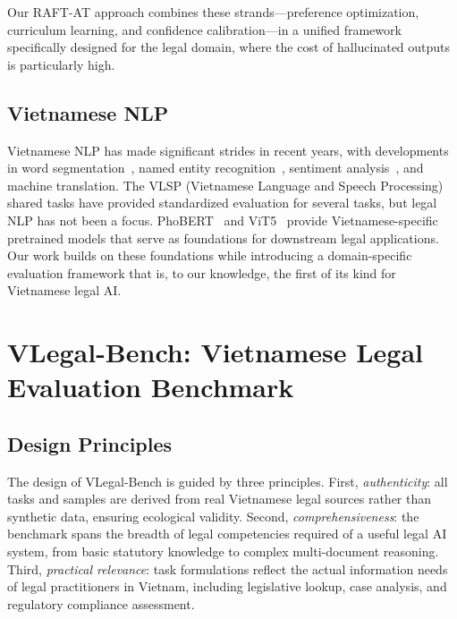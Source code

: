 \documentclass[11pt,a4paper]{article}
\newcommand{\system}{VLegal-Bench}
\begin{document}
Our RAFT-AT approach combines these strands---preference optimization, curriculum learning, and confidence calibration---in a unified framework specifically designed for the legal domain, where the cost of hallucinated outputs is particularly high.

\subsection{Vietnamese NLP}

Vietnamese NLP has made significant strides in recent years, with developments in word segmentation~\citep{nguyen2019vns}, named entity recognition~\citep{truong2022vner}, sentiment analysis~\citep{nguyen2020vlsp}, and machine translation.
The VLSP (Vietnamese Language and Speech Processing) shared tasks have provided standardized evaluation for several tasks, but legal NLP has not been a focus.
PhoBERT~\citep{nguyen2020phobert} and ViT5~\citep{phan2022vit5} provide Vietnamese-specific pretrained models that serve as foundations for downstream legal applications.
Our work builds on these foundations while introducing a domain-specific evaluation framework that is, to our knowledge, the first of its kind for Vietnamese legal AI.

\section{VLegal-Bench: Vietnamese Legal Evaluation Benchmark}
\label{sec:benchmark}

\subsection{Design Principles}

The design of \system{} is guided by three principles.
First, \emph{authenticity}: all tasks and samples are derived from real Vietnamese legal sources rather than synthetic data, ensuring ecological validity.
Second, \emph{comprehensiveness}: the benchmark spans the breadth of legal competencies required of a useful legal AI system, from basic statutory knowledge to complex multi-document reasoning.
Third, \emph{practical relevance}: task formulations reflect the actual information needs of legal practitioners in Vietnam, including legislative lookup, case analysis, and regulatory compliance assessment.
\end{document}
